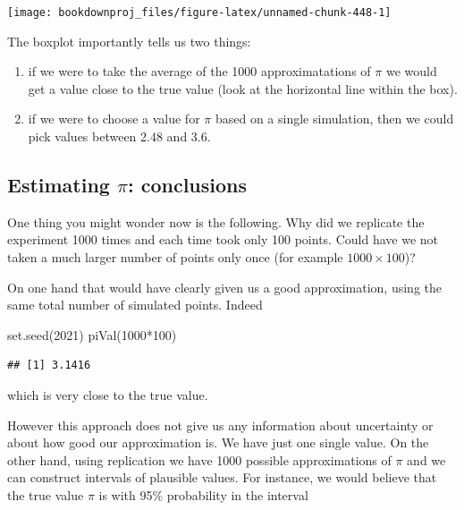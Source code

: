 \documentclass[
]{book}
\newenvironment{Shaded}{\begin{snugshade}}{\end{snugshade}}
\newcommand{\DecValTok}[1]{\textcolor[rgb]{0.00,0.00,0.81}{#1}}
\newcommand{\FunctionTok}[1]{\textcolor[rgb]{0.00,0.00,0.00}{#1}}
\newcommand{\NormalTok}[1]{#1}
\newcommand{\SpecialCharTok}[1]{\textcolor[rgb]{0.00,0.00,0.00}{#1}}
\theoremstyle{definition}
\theoremstyle{definition}
\theoremstyle{definition}
\theoremstyle{definition}
\theoremstyle{remark}
\begin{document}
\begin{center}\texttt{[image: bookdownproj\_files/figure-latex/unnamed-chunk-448-1]} \end{center}

The boxplot importantly tells us two things:

\begin{enumerate}
\def\labelenumi{\arabic{enumi}.}
\item
  if we were to take the average of the 1000 approximatations of \(\pi\) we would get a value close to the true value (look at the horizontal line within the box).
\item
  if we were to choose a value for \(\pi\) based on a single simulation, then we could pick values between 2.48 and 3.6.
\end{enumerate}

\hypertarget{estimating-pi-conclusions}{%
\subsection{\texorpdfstring{Estimating \(\pi\): conclusions}{Estimating \textbackslash pi: conclusions}}\label{estimating-pi-conclusions}}

One thing you might wonder now is the following. Why did we replicate the experiment 1000 times and each time took only 100 points. Could have we not taken a much larger number of points only once (for example \(1000\times 100\))?

On one hand that would have clearly given us a good approximation, using the same total number of simulated points. Indeed

\begin{Shaded}
\begin{Highlighting}[]
\FunctionTok{set.seed}\NormalTok{(}\DecValTok{2021}\NormalTok{)}
\FunctionTok{piVal}\NormalTok{(}\DecValTok{1000}\SpecialCharTok{*}\DecValTok{100}\NormalTok{)}
\end{Highlighting}
\end{Shaded}

\begin{verbatim}
## [1] 3.1416
\end{verbatim}

which is very close to the true value.

However this approach does not give us any information about uncertainty or about how good our approximation is. We have just one single value. On the other hand, using replication we have 1000 possible approximations of \(\pi\) and we can construct intervals of plausible values. For instance, we would believe that the true value \(\pi\) is with 95\% probability in the interval
\end{document}
